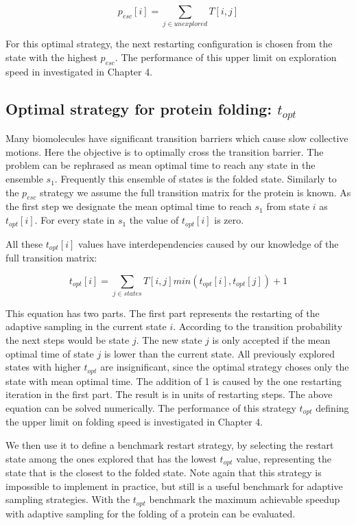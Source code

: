$$p_{esc}[i]=\sum_{j \in unexplored}T[i, j]$$

For this optimal strategy, the next restarting configuration is chosen from the state with the highest $p_{esc}$. The performance of this upper limit on exploration speed in investigated in Chapter 4.

\subsection{Optimal strategy for protein folding: $t_{opt}$} 

Many biomolecules have significant transition barriers which cause slow collective motions. Here the objective is to optimally cross the transition barrier.
The problem can be rephrased as mean optimal time to reach any state in the ensemble  $s_1$. Frequently this ensemble of states is the folded state.  
Similarly to the $p_{esc}$ strategy we assume the full transition matrix for the protein is known. As the first step we designate the mean optimal time to reach $s_1$ from state $i$ as $t_{opt}[i]$.
For every state in $s_1$ the value of  $t_{opt}[i]$ is zero.

All these $t_{opt}[i]$ values have interdependencies caused by our knowledge of the full transition matrix:

$$t_{opt}[i]=\sum_{j \in states}T[i,j]min(t_{opt}[i],t_{opt}[j])+1$$

This equation has two parts. The first part represents the restarting of the adaptive sampling in the current state $i$. According to the transition probability the next steps would be state $j$. The new state $j$ is only accepted if the mean optimal time of state $j$ is lower than the current state. All previously explored states with higher $t_{opt}$ are insignificant, since the optimal strategy choses only the state with mean optimal time. The addition of 1 is caused by the one restarting iteration in the first part. The result is in units of restarting steps. The above equation can be solved numerically. The performance of this strategy $t_{opt}$ defining the upper limit on folding speed is investigated in Chapter 4.

We then use it to define a benchmark restart strategy, by
selecting the restart state among the ones explored that has the lowest
$t_{opt}$ value, representing the state that is the closest to the folded
state. Note again that this strategy is impossible to implement in
practice, but still is a useful benchmark for adaptive sampling strategies.
With the $t_{opt}$ benchmark the maximum achievable speedup with adaptive
sampling for the folding of a protein can be evaluated.


